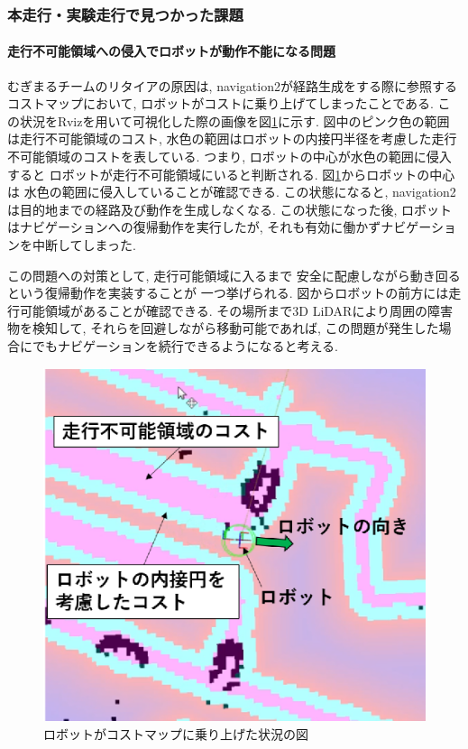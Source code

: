 \subsubsection{本走行・実験走行で見つかった課題}
\paragraph{走行不可能領域への侵入でロボットが動作不能になる問題}
むぎまるチームのリタイアの原因は, navigation2が経路生成をする際に参照する
コストマップにおいて, ロボットがコストに乗り上げてしまったことである. 
この状況をRvizを用いて可視化した際の画像を図\ref{fig:mugimaru_result}に示す. 
図中のピンク色の範囲は走行不可能領域のコスト, 
水色の範囲はロボットの内接円半径を考慮した走行不可能領域のコストを表している. 
つまり, ロボットの中心が水色の範囲に侵入すると
ロボットが走行不可能領域にいると判断される. 
図\ref{fig:mugimaru_result}からロボットの中心は
水色の範囲に侵入していることが確認できる. 
この状態になると, navigation2は目的地までの経路及び動作を生成しなくなる. 
この状態になった後, ロボットはナビゲーションへの復帰動作を実行したが, 
それも有効に働かずナビゲーションを中断してしまった. 

この問題への対策として, 走行可能領域に入るまで
安全に配慮しながら動き回るという復帰動作を実装することが
一つ挙げられる. 
図からロボットの前方には走行可能領域があることが確認できる. 
その場所まで3D LiDARにより周囲の障害物を検知して, 
それらを回避しながら移動可能であれば, 
この問題が発生した場合にでもナビゲーションを続行できるようになると考える. 
\begin{figure}[h]
  \begin{center}
  	\includegraphics[width=0.9\linewidth]{figs/mugimaru_result.eps}
  	\caption{ロボットがコストマップに乗り上げた状況の図} 
  	\label{fig:mugimaru_result}
  \end{center}
\end{figure}

